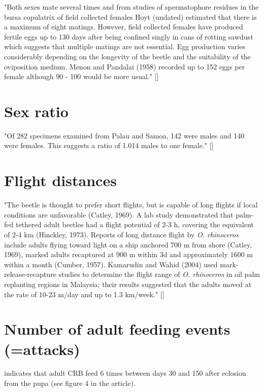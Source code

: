 \documentclass[12pt,letterpaper,english,bibliography=totocnumbered, abstract=on]{scrartcl}
\begin{document}
"Both sexes mate several times and from studies of spermatophore residues in the bursa copulatrix
of field collected females Hoyt (undated) estimated that there is a maximum of eight matings. However,
field collected females have produced fertile eggs up to 130 days after being confined singly in cans of
rotting sawdust which suggests that multiple matings are not essential. Egg production varies considerably
depending on the longevity of the beetle and the suitability of the oviposition medium. Menon and Pandalai (1958) recorded up to 152 eggs per female although 90 - 100 would be more usual." [\cite{catley_coconut_1969}]

\section{Sex ratio}

"Of 282 specimens examined from Palau and Samoa, 142 were males and 140 were females. This suggests a ratio of 1.014 males to one female." [\cite{gressitt_coconut_1953}]

\section{Flight distances}
"The beetle is thought to prefer short flights, but
is capable of long flights if local conditions are unfavorable (Catley, 1969). A
lab study demonstrated that palm-fed tethered adult beetles had a flight
potential of 2-3 h, covering the equivalent of 2-4 km (Hinckley, 1973).
Reports of long distance flight by \textit{O. rhinoceros} include adults flying toward
light on a ship anchored 700 m from shore (Catley, 1969), marked adults
recaptured at 900 m within 3d and approximately 1600 m within a month
(Cumber, 1957). Kamarudin and Wahid (2004) used mark-release-recapture
studies to determine the flight range of \textit{O. rhinoceros} in oil palm replanting
regions in Malaysia; their results suggested that the adults moved at the rate of
10-23 m/day and up to 1.3 km/week." [\cite{pallipparambil_new_2015}]

\section{Number of adult feeding events (=attacks)}

\cite{vander_meer_per_1987} indicates that adult CRB feed 6 times between days 30 and 150 after eclosion from the pupa (see figure 4 in the article).

\newpage
\end{document}
